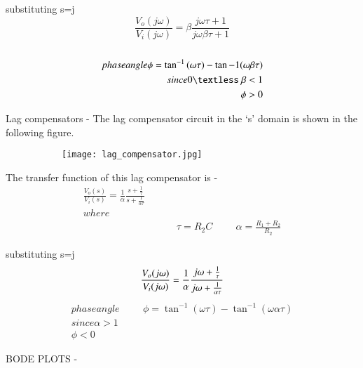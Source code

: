 \begin{enumerate}[label=\thesubsection.\arabic*.,ref=\thesubsection.\theenumi]
\vspace{0.3cm}substituting s=j\omega \\
\begin{equation}
 \frac{V_o(j\omega)}{V_i(j\omega)} = \beta  \frac{j\omega \tau +1}{j \omega\beta \tau +1}
\end{equation}
\\
\begin{align}
phase angle \phi = \tan^{-1} {(\omega\tau)} - \tan{-1}{(\omega\beta\tau)}\\
since 0 \textless \ \beta < 1\\
\phi > 0
\end{align}




Lag compensators - 
The lag compensator circuit in the ‘s’ domain is shown in the following figure.
 
\begin{figure}[h]
 
\begin{subfigure}{0.5\textwidth}
\texttt{[image: lag\_compensator.jpg]} 
\label{fig:subim1}
\end{subfigure}
\end{figure}

The transfer function of this lag compensator is -
\begin{align}
    \frac{V_o(s)}{V_i(s)} = \frac{1}{\alpha}  \frac{s + \frac{1}{\tau}}{s + \frac{1}{\alpha\tau}} \\
where\\
\hspace{4cm} \tau = R_2C \hspace{1cm} \alpha =\frac{R_1+R_2}{R_2}
\end{align}

\vspace{0.3cm}substituting s=j\omega \\
\begin{equation}
\centering
 \frac{V_o(j\omega)}{V_i(j\omega)} = \frac{1}{\alpha}  \frac{j\omega + \frac{1}{\tau}}{j\omega + \frac{1}{\alpha\tau}}
\end{equation}
\begin{align}
phase angle \hspace{1cm}\phi = \tan^{-1} {(\omega\tau)} - \tan^{-1}{(\omega\alpha\tau)}\\
since \alpha > 1\\
\phi < 0
\end{align}


BODE PLOTS -
\begin{figure}[h]
 

\end{figure}
\end{enumerate}
